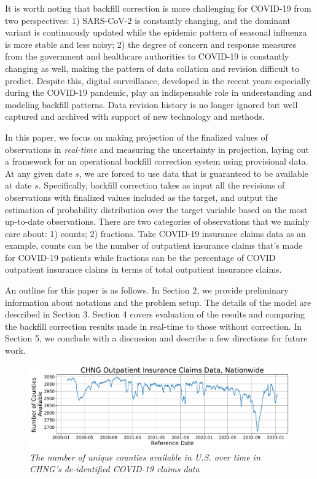 It is worth noting that backfill correction is more challenging for COVID-19 from two perspectives: 1) SARS-CoV-2 is constantly changing, and the dominant variant is continuously updated while the epidemic pattern of seasonal influenza is more stable and less noisy; 2) the degree of concern and response measures from the government and healthcare authorities to COVID-19 is constantly changing as well, making the pattern of data collation and revision difficult to predict. Despite this, digital surveillance, developed in the recent years especially during the COVID-19 pandemic, play an indispensable role in understanding and modeling backfill patterns. Data revision history is no longer ignored but well captured and archived with support of new technology and methods.


In this paper, we focus on making projection of the finalized values of observations in \textit{real-time} and measuring the uncertainty in projection, laying out a framework for an operational backfill correction system using provisional data. At any given date $s$, we are forced to use data that is guaranteed to be available at date $s$. Specifically, backfill correction takes as input all the revisions of observations with finalized values included as the target, and output the estimation of probability distribution over the target variable based on the most up-to-date observations. There are two categories of observations that we mainly care about: 1) counts; 2) fractions. Take COVID-19 insurance claims data as an example, counts can be the number of outpatient insurance claims that's made for COVID-19 patients while fractions can be the percentage of COVID outpatient insurance claims in terms of total outpatient insurance claims.

An outline for this paper is as follows. In Section 2, we provide preliminary information about notations and the problem setup. The details of the model are described in Section 3. Section 4 covers evaluation of the results and comparing the backfill correction results made in real-time to those without correction. In Section 5, we conclude with a discussion and describe a few directions for future work.

\begin{figure}
    \centering
    \includegraphics[width=\textwidth]{figs/available_counties.pdf}
    \caption{\textit{The number of unique counties available in U.S. over time in CHNG's de-identified COVID-19 claims data}}
\end{figure}